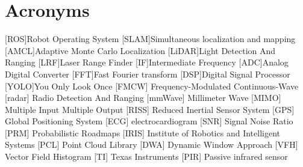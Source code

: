 \chapter*{Acronyms}
	\begin{acronym}[RELAX NG]
	[ROS]{Robot Operating System}
	[SLAM]{Simultaneous localization and mapping}
    [AMCL]{Adaptive Monte Carlo Localization}
    [LiDAR]{Light Detection And Ranging}
	[LRF]{Laser Range Finder}
	[IF]{Intermediate Frequency}
	[ADC]{Analog Digital Converter}
	[FFT]{Fast Fourier transform}
    [DSP]{Digital Signal Processor}
	[YOLO]{You Only Look Once}
	 [FMCW] {Frequency-Modulated Continuous-Wave}
	[radar] {Radio Detection And Ranging}
	[mmWave] {Millimeter Wave}
	[MIMO] {Multiple Input Multiple Output}
	[RISS] {Reduced Inertial Sensor System}
	[GPS] {Global Positioning System}
	[ECG] {electrocardiogram}
	[SNR] {Signal Noise Ratio}
	[PRM] {Probabilistic Roadmaps}
	[IRIS] {Institute of Robotics and Intelligent Systems}
	[PCL] {Point Cloud Library}
	[DWA] {Dynamic Window Approach}
	[VFH] {Vector Field Histogram}
	[TI] {Texas Instruments}
	[PIR] {Passive infrared sensor}
	
	
	\end{acronym}